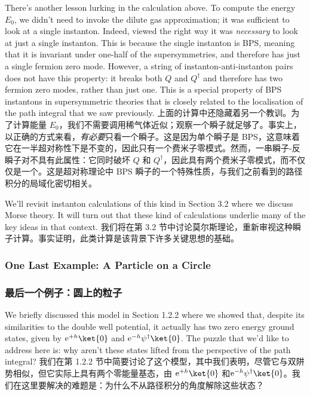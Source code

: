 \documentclass{ctexart}
\newcommand{\rme}{\mathrm{e}}
\begin{document}
\begin{paracol}{2}
There’s another lesson lurking in the calculation above. To compute the energy $E_0$, we didn’t need to invoke the dilute gas approximation; it was suﬃcient to look at a single instanton. Indeed, viewed the right way it was \textit{necessary} to look at just a single instanton. This is because the single instanton is BPS, meaning that it is invariant under one-half of the supersymmetries, and therefore has just a single fermion zero mode. However, a string of instanton-anti-instanton pairs does not have this property: it breaks both $Q$ and $Q^{\dagger}$ and therefore has two fermion zero modes, rather than just one. This is a special property of BPS instantons in supersymmetric theories that is closely related to the localisation of the path integral that we saw previously.
\switchcolumn
上面的计算中还隐藏着另一个教训。为了计算能量 $E_0$，我们不需要调用稀气体近似；观察一个瞬子就足够了。事实上，以正确的方式来看，\textit{有必要}只看一个瞬子。这是因为单个瞬子是 BPS，这意味着它在一半超对称性下是不变的，因此只有一个费米子零模式。然而，一串瞬子-反瞬子对不具有此属性：它同时破坏 $Q$ 和 $Q^{\dagger}$，因此具有两个费米子零模式，而不仅仅是一个。这是超对称理论中 BPS 瞬子的一个特殊性质，与我们之前看到的路径积分的局域化密切相关。
\switchcolumn*

We’ll revisit instanton calculations of this kind in Section 3.2 where we discuss Morse theory. It will turn out that these kind of calculations underlie many of the key ideas in that context.
\switchcolumn
我们将在第 3.2 节中讨论莫尔斯理论，重新审视这种瞬子计算。事实证明，此类计算是该背景下许多关键思想的基础。
\switchcolumn*

\subsubsection{One Last Example: A Particle on a Circle}
\switchcolumn
\subsubsection*{最后一个例子：圆上的粒子}
\switchcolumn*

We briefly discussed this model in Section 1.2.2 where we showed that, despite its similarities to the double well potential, it actually has two zero energy ground states, given by $\rme^{+ h} \ket{0}$ and $\rme^{- h} \psi^{\dagger} \ket{0}$. The puzzle that we’d like to address here is: why aren’t these states lifted from the perspective of the path integral?
\switchcolumn
我们在第 1.2.2 节中简要讨论了这个模型，其中我们表明，尽管它与双阱势相似，但它实际上具有两个零能量基态，由 $\rme^{+ h} \ket{0}$ 和$\rme^{- h} \psi^{\dagger} \ket{0}$。我们在这里要解决的难题是：为什么不从路径积分的角度解除这些状态？
\switchcolumn*


\end{paracol}
\end{document}
